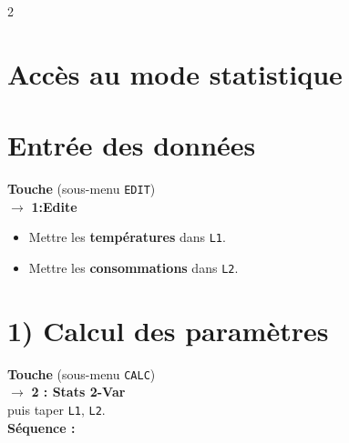 \documentclass[11pt,a4paper]{article}
\begin{document}
\begin{multicols}{2}
\setlength{\columnsep}{0.5cm}

\section*{\small Accès au mode statistique}
\section*{\small Entrée des données}

\begin{tcolorbox}[colback=graybox, colframe=darkblue, arc=2mm, boxrule=0.8pt]
    \small
    \textbf{Touche}  (sous-menu \texttt{EDIT}) \\[5mm]
    $\rightarrow$ \textbf{1:Edite}
    
    \vspace{0.2cm}
    \begin{itemize}[leftmargin=*, itemsep=0pt]
        \item Mettre les \textbf{températures} dans \texttt{L1}. \\[5mm]
        \item Mettre les \textbf{consommations} dans \texttt{L2}. \\[5mm]
    \end{itemize}
\end{tcolorbox}

\vspace{0.3cm}

\section*{\small 1) Calcul des paramètres}

\begin{tcolorbox}[colback=graybox, colframe=darkblue, arc=2mm, boxrule=0.8pt]
    \small
    \textbf{Touche}  (sous-menu \texttt{CALC}) \\[5mm]
    $\rightarrow$ \textbf{2 : Stats 2-Var} \\[5mm]
    
    puis taper \texttt{L1}, \texttt{L2}. \\[5mm]
    
    \vspace{0.1cm}
    \textbf{Séquence :}   \fbox{\texttt{,}}   
    

\end{tcolorbox}
\end{multicols}
\end{document}

